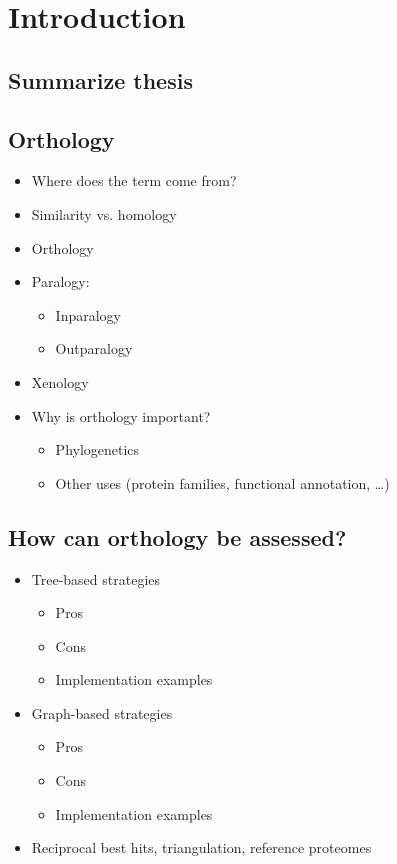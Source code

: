 \documentclass[a4paper]{scrartcl}
\begin{document}
\section{Introduction}

\subsection{Summarize thesis}

\subsection{Orthology}

\begin{itemize}
	\item Where does the term come from?
	\item Similarity vs. homology
	\item Orthology
	\item Paralogy:
	\begin{itemize}
		\item Inparalogy
		\item Outparalogy
	\end{itemize}
	\item Xenology
	\item Why is orthology important?
	\begin{itemize}
		\item Phylogenetics
		\item Other uses (protein families, functional annotation, \ldots)
	\end{itemize}
\end{itemize}

\subsection{How can orthology be assessed?}

\begin{itemize}
	\item Tree-based strategies
	\begin{itemize}
		\item Pros
		\item Cons
		\item Implementation examples
	\end{itemize}
	\item Graph-based strategies
	\begin{itemize}
		\item Pros
		\item Cons
		\item Implementation examples
	\end{itemize}
	\item Reciprocal best hits, triangulation, reference proteomes
\end{itemize}
\end{document}
